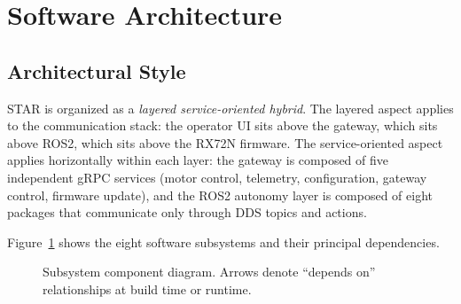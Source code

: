 \documentclass[11pt,letterpaper]{article}
\begin{document}
\section{Software Architecture}
\label{sec:architecture}

\subsection{Architectural Style}
STAR is organized as a \emph{layered service-oriented hybrid}. The
layered aspect applies to the communication stack: the operator UI
sits above the gateway, which sits above ROS2, which sits above the
RX72N firmware. The service-oriented aspect applies horizontally
within each layer: the gateway is composed of five independent gRPC
services (motor control, telemetry, configuration, gateway control,
firmware update), and the ROS2 autonomy layer is composed of eight
packages that communicate only through DDS topics and actions.

Figure~\ref{fig:components} shows the eight software subsystems and
their principal dependencies.

\begin{figure}[H]
\centering
{}
\caption{Subsystem component diagram. Arrows denote
``depends on'' relationships at build time or runtime.}
\label{fig:components}
\end{figure}
\end{document}
